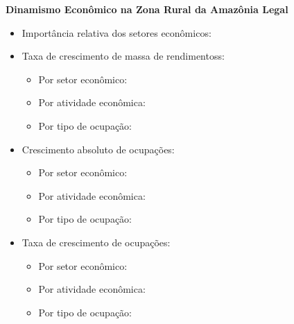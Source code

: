 \documentclass[8pt]{beamer}
\begin{document}
\begin{frame}[label=indice_principal_amz_rural]{}

\textit{\hyperlink{indice_principal}{}}

\textbf{Dinamismo Econômico na Zona Rural da Amazônia Legal}
\vspace{2mm}

\begin{itemize}

\item{Importância relativa dos setores econômicos: \hyperlink{_amz_rural_importancia_relativa}{}}
\vspace{1mm}

\item{Taxa de crescimento  de massa de rendimentoss:
	\begin{itemize}
	\item{Por setor econômico: \hyperlink{amzruralrkngtxmassaporsetor}{}}
	\item{Por atividade econômica: \hyperlink{amzruralrkngtxmassaporatividade}{}}
	\item{Por tipo de ocupação: \hyperlink{amzruralrkngtxmassaporocupacao}{}}
	\end{itemize}
}
\vspace{1mm}

\item{Crescimento  absoluto de ocupações:
	\begin{itemize}
	\item{Por setor econômico: \hyperlink{amzruralrkngnocuporsetor}{}}
	\item{Por atividade econômica: \hyperlink{amzruralrkngnocuporatividade}{}}
	\item{Por tipo de ocupação: \hyperlink{amzruralrkngnocuporocupacao}{}}
	\end{itemize}
}
\vspace{1mm}

\item{Taxa de crescimento de ocupações:
	\begin{itemize}
	\item{Por setor econômico: \hyperlink{amzruralrkngtxocuporsetor}{}}
	\item{Por atividade econômica: \hyperlink{amzruralrkngtxocuporatividade}{}}
	\item{Por tipo de ocupação: \hyperlink{amzruralrkngtxocuporocupacao}{}}
	\end{itemize}
}
\vspace{1mm}


\end{itemize}
\end{frame}
\end{document}
